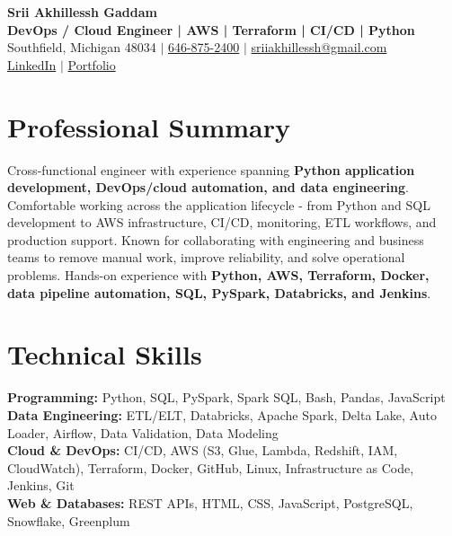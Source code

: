 \documentclass[letterpaper,10pt]{article}
\begin{document}
\fontsize{9.35pt}{10.45pt}\selectfont

\begin{center}
    {\LARGE \textbf{Srii Akhillessh Gaddam}} \\[-1pt]
    \textbf{DevOps / Cloud Engineer | AWS | Terraform | CI/CD | Python} \\[2pt]
    Southfield, Michigan 48034 $|$
    \href{tel:6468752400}{646-875-2400} $|$
    \href{mailto:sriiakhillessh@gmail.com}{sriiakhillessh@gmail.com} \\[1pt]
    \href{https://www.linkedin.com/in/srii-akhiilessh-gaddam-b48668191/}{LinkedIn} $|$
    \href{https://sriiakhillesshg.github.io/portfolio/}{Portfolio}
\end{center}
\vspace{-8pt}

\section{Professional Summary}
\small{Cross-functional engineer with experience spanning \textbf{Python application development, DevOps/cloud automation, and data engineering}. Comfortable working across the application lifecycle - from Python and SQL development to AWS infrastructure, CI/CD, monitoring, ETL workflows, and production support. Known for collaborating with engineering and business teams to remove manual work, improve reliability, and solve operational problems. Hands-on experience with \textbf{Python, AWS, Terraform, Docker, data pipeline automation, SQL, PySpark, Databricks, and Jenkins}.}

\section{Technical Skills}
\small{
\textbf{Programming:} Python, SQL, PySpark, Spark SQL, Bash, Pandas, JavaScript \\
\textbf{Data Engineering:} ETL/ELT, Databricks, Apache Spark, Delta Lake, Auto Loader, Airflow, Data Validation, Data Modeling \\
\textbf{Cloud \& DevOps:} CI/CD, AWS (S3, Glue, Lambda, Redshift, IAM, CloudWatch), Terraform, Docker, GitHub, Linux, Infrastructure as Code, Jenkins, Git \\
\textbf{Web \& Databases:} REST APIs, HTML, CSS, JavaScript, PostgreSQL, Snowflake, Greenplum
}
\end{document}
